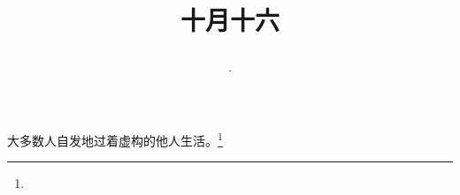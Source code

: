 \title{\date[d=16,m=11,y=2024][year:cn-y,年,month:cn,day:cn,日,·,weekday]·十月十六 }
大多数人自发地过着虚构的他人生活。\footnote{ }

